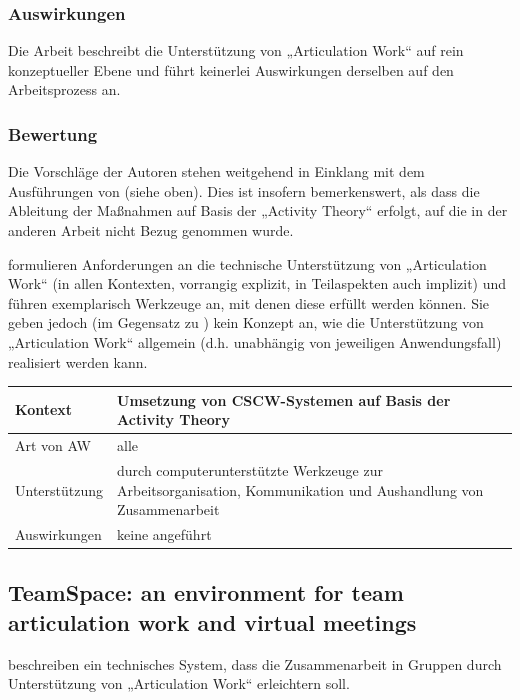 \subsubsection{Auswirkungen}

Die Arbeit beschreibt die Unterstützung von „Articulation Work“ auf rein konzeptueller Ebene und führt keinerlei Auswirkungen derselben auf den Arbeitsprozess an.

\subsubsection{Bewertung}

Die Vorschläge der Autoren stehen weitgehend in Einklang mit dem Ausführungen von \citet{Schmidt96} (siehe oben). Dies ist insofern bemerkenswert, als dass die Ableitung der Maßnahmen auf Basis der „Activity Theory“ erfolgt, auf die in der anderen Arbeit nicht Bezug genommen wurde.

\citeauthor{Fjuk97} formulieren Anforderungen an die technische Unterstützung von „Articulation Work“ (in allen Kontexten, vorrangig explizit, in Teilaspekten auch implizit) und führen exemplarisch Werkzeuge an, mit denen diese erfüllt werden können. Sie geben jedoch (im Gegensatz zu \citet{Schmidt96}) kein Konzept an, wie die Unterstützung von „Articulation Work“ allgemein (d.h. unabhängig von jeweiligen Anwendungsfall) realisiert werden kann.
\\[1em]
\begin{tabular}{| p{3cm} | p{10cm} |}
  \hline
  Kontext & Umsetzung von \gls{CSCW}-Systemen auf Basis der Activity Theory \\ \hline
  Art von AW & alle \\ \hline
  Unterstützung & durch computerunterstützte Werkzeuge zur Arbeitsorganisation, Kommunikation und Aushandlung von Zusammenarbeit\\ \hline
  Auswirkungen & keine angeführt \\ \hline
\end{tabular}

\subsection{TeamSpace: an environment for team articulation work and virtual meetings}
\label{sub:teamspace}

\citet{Fuchs01} beschreiben ein technisches System, dass die Zusammenarbeit in Gruppen durch Unterstützung von „Articulation Work“ erleichtern soll.

